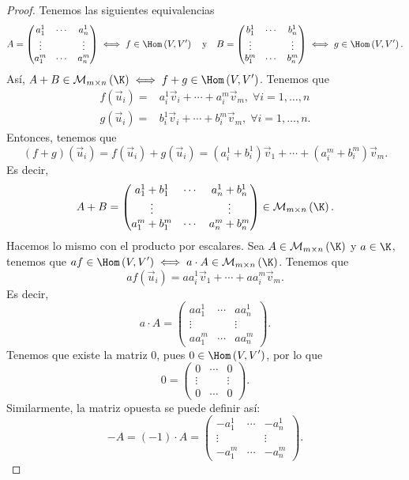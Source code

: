 \begin{proof}
Tenemos las siguientes equivalencias
\[ A = \begin{pmatrix} 
	a^{1}_{1} & \cdots & a^{1}_{n} \\
	\vdots & & \vdots \\
	a^{m}_{1} & \cdots & a^{m}_{n}
\end{pmatrix} \iff f \in \Hom\left(V, V'\right) \quad \text{y} \quad B = \begin{pmatrix} 
	b^{1}_{1} & \cdots & b^{1}_{n} \\
	\vdots & & \vdots \\
	b^{m}_{1} & \cdots & b^{m}_{n}
\end{pmatrix} \iff g \in \Hom\left(V, V'\right).\]
Así, $\displaystyle A + B \in \mathcal{M}_{m \times n}\left(\K\right) \iff f + g \in \Hom\left(V, V'\right) $. Tenemos que 
\[
\begin{split}
	f\left(\vec{u}_{i}\right)  = & a^{1}_{i}\vec{v}_{i} + \cdots + a^{m}_{i}\vec{v}_{m}, \; \forall i = 1, \ldots, n \\
	g\left(\vec{u}_{i}\right)= & b^{1}_{i}\vec{v}_{i} + \cdots + b^{m}_{i}\vec{v}_{m}, \; \forall i = 1, \ldots, n .
\end{split}
\]
Entonces, tenemos que 
\[\left(f + g\right)\left(\vec{u}_{i}\right) = f\left(\vec{u}_{i}\right) + g\left(\vec{u}_{i}\right) = \left(a^{1}_{i}+b^{1}_{i}\right)\vec{v}_{1} + \cdots + \left(a^{m}_{i}+b^{m}_{i}\right)\vec{v}_{m}.\]
Es decir, 
\[A + B = \begin{pmatrix} a^{1}_{1} + b^{1}_{1} & \cdots & a^{1}_{n} + b^{1}_{n}\\
\vdots & & \vdots \\
a^{m}_{1}+b^{m}_{1} & \cdots & a^{m}_{n} + b^{m}_{n}\end{pmatrix} \in \mathcal{M}_{m \times n}\left(\K\right).\]
Hacemos lo mismo con el producto por escalares. Sea $\displaystyle A \in \mathcal{M}_{m\times n}\left(\K\right) $ y $\displaystyle a \in \K $, tenemos que $\displaystyle af \in \Hom\left(V, V'\right) \iff a \cdot A \in \mathcal{M}_{m\times n}\left(\K\right) $. Tenemos que 
\[af\left(\vec{u}_{i}\right) = a a^{1}_{i}\vec{v}_{1} + \cdots + a a^{m}_{i}\vec{v}_{m} .\]
Es decir, 
\[a \cdot A = \begin{pmatrix} a a^{1}_{1} & \cdots & a a^{1}_{n} \\
\vdots & & \vdots \\
a a ^{m}_{1} & \cdots & a a^{m}_{n}\end{pmatrix} .\]
Tenemos que existe la matriz 0, pues $\displaystyle 0 \in \Hom\left(V, V'\right) $, por lo que 
	\[0 = \begin{pmatrix} 0 & \cdots & 0 \\
	\vdots & & \vdots \\
0 & \cdots & 0\end{pmatrix} .\]
Similarmente, la matriz opuesta se puede definir así:
		\[-A = \left(-1\right) \cdot A = \begin{pmatrix} -a^{1}_{1} & \cdots & -a^{1}_{n} \\
		\vdots & & \vdots \\
	-a^{m}_{1} & \cdots & -a^{m}_{n}\end{pmatrix} .\]
\end{proof}


